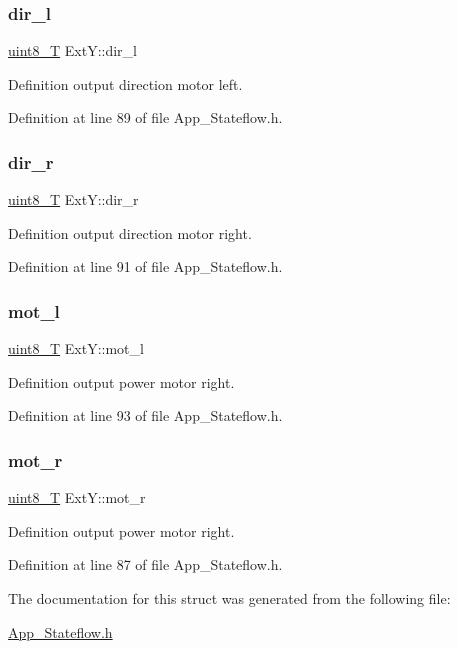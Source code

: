 \subsubsection{\texorpdfstring{dir\+\_\+l}{dir\_l}}
{\footnotesize\ttfamily \mbox{\hyperlink{_app___stateflowtypes_8h_a2532a6244e023eee49f315c10f1f7c53}{uint8\+\_\+T}} Ext\+Y\+::dir\+\_\+l}



Definition output direction motor left. 



Definition at line 89 of file App\+\_\+\+Stateflow.\+h.

\mbox{\label{struct_ext_y_abe09271200dc96e32093a19312a23686}} 
\subsubsection{\texorpdfstring{dir\+\_\+r}{dir\_r}}
{\footnotesize\ttfamily \mbox{\hyperlink{_app___stateflowtypes_8h_a2532a6244e023eee49f315c10f1f7c53}{uint8\+\_\+T}} Ext\+Y\+::dir\+\_\+r}



Definition output direction motor right. 



Definition at line 91 of file App\+\_\+\+Stateflow.\+h.

\mbox{\label{struct_ext_y_a20f11c28f5b2d9f4a24766c4d56678e9}} 
\subsubsection{\texorpdfstring{mot\+\_\+l}{mot\_l}}
{\footnotesize\ttfamily \mbox{\hyperlink{_app___stateflowtypes_8h_a2532a6244e023eee49f315c10f1f7c53}{uint8\+\_\+T}} Ext\+Y\+::mot\+\_\+l}



Definition output power motor right. 



Definition at line 93 of file App\+\_\+\+Stateflow.\+h.

\mbox{\label{struct_ext_y_aa589c8750c337a99456c3e29975ec7fb}} 
\subsubsection{\texorpdfstring{mot\+\_\+r}{mot\_r}}
{\footnotesize\ttfamily \mbox{\hyperlink{_app___stateflowtypes_8h_a2532a6244e023eee49f315c10f1f7c53}{uint8\+\_\+T}} Ext\+Y\+::mot\+\_\+r}



Definition output power motor right. 



Definition at line 87 of file App\+\_\+\+Stateflow.\+h.



The documentation for this struct was generated from the following file\+:\begin{DoxyCompactItemize}
\item 
\mbox{\hyperlink{_app___stateflow_8h}{App\+\_\+\+Stateflow.\+h}}\end{DoxyCompactItemize}

